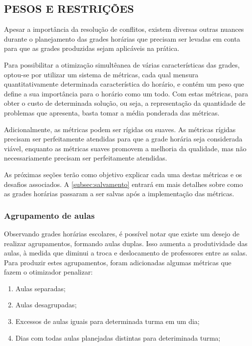 \subsection{PESOS E RESTRIÇÕES}

Apesar a importância da resolução de conflitos, existem diversas outras nuances durante o planejamento das grades horárias que precisam ser levadas em conta para que as grades produzidas sejam aplicáveis na prática.

Para possibilitar a otimização simultêanea de várias características das grades, optou-se por utilizar um sistema de métricas, cada qual mensura quantitativamente determinada característica do horário, e contém um peso que define a sua importância para o horário como um todo. Com estas métricas, para obter o custo de determinada solução, ou seja, a representação da quantidade de problemas que apresenta, basta tomar a média ponderada das métricas. 

Adicionalmente, as métricas podem ser rígidas ou suaves. As métricas rígidas precisam ser perfeitamente atendidas para que a grade horária seja considerada viável, enquanto as métricas suaves promovem a melhoria da qualidade, mas não necessariamente precisam ser perfeitamente atendidas.

As próximas seções terão como objetivo explicar cada uma destas métricas e os desafios associados. A \autoref{subsec:salvamento} entrará em mais detalhes sobre como as grades horárias passaram a ser salvas após a implementação das métricas.

\subsubsection{Agrupamento de aulas}

Observando grades horárias escolares, é possível notar que existe um desejo de realizar agrupamentos, formando aulas duplas. Isso aumenta a produtividade das aulas, à medida que diminui a troca e deslocamento de professores entre as salas. Para produzir estes agrupamentos, foram adicionadas algumas métricas que fazem o otimizador penalizar:

\begin{enumerate}
	\item Aulas separadas;
	\item Aulas desagrupadas;
	\item Excessos de aulas iguais para determinada turma em um dia;
	\item Dias com todas aulas planejadas distintas para deteriminada turma;
\end{enumerate}

